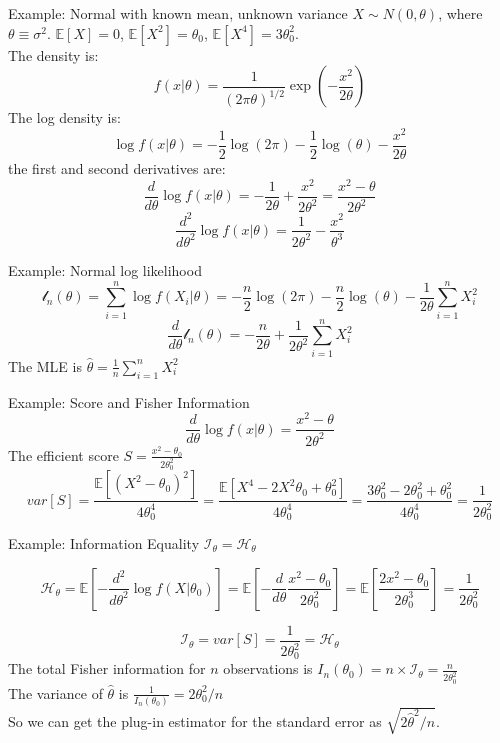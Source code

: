 \documentclass[aspectratio=169, handout, t]{beamer}
\numberwithin{equation}{section}
\begin{document}
\begin{frame}{Example: Normal with known mean, unknown variance}
$X\sim N(0, \theta)$, where $\theta\equiv \sigma^2$. $\mathbb{E}[X]=0$, $\mathbb{E}[X^2]=\theta_0$, $\mathbb{E}[X^4]=3\theta_0^2$.\\
The density is:
 $$f(x|\theta)=\frac{1}{(2\pi\theta)^{1/2}}\exp(-\frac{x^2}{2\theta})$$
The log density is:
$$\log f(x|\theta)=-\frac{1}{2}\log(2\pi)-\frac{1}{2}\log(\theta)-\frac{x^2}{2\theta}$$
the first and second derivatives are:
$$\frac{d}{d\theta}\log f(x|\theta)=-\frac{1}{2\theta}+\frac{x^2}{2\theta^2}=\frac{x^2-\theta}{2\theta^2}$$
$$\frac{d^2}{d\theta^2}\log f(x|\theta)=\frac{1}{2\theta^2}-\frac{x^2}{\theta^3}$$

\end{frame}


\begin{frame}{Example: Normal log likelihood}
$$\mathcal{l}_n(\theta)=\sum_{i=1}^n \log f(X_i|\theta)=-\frac{n}{2}\log(2\pi)-\frac{n}{2}\log(\theta)-\frac{1}{2\theta}\sum_{i=1}^n X_i^2$$
$$\frac{d}{d\theta}\mathcal{l}_n(\theta)=-\frac{n}{2\theta}+\frac{1}{2\theta^2}\sum_{i=1}^n X_i^2$$
The MLE is $\hat{\theta}=\frac{1}{n}\sum_{i=1}^n X_i^2$
\end{frame}


\begin{frame}{Example: Score and Fisher Information}
$$\frac{d}{d\theta}\log f(x|\theta)=\frac{x^2-\theta}{2\theta^2}$$
The efficient score $S=\frac{x^2-\theta_0}{2\theta_0^2}$
$$var[S]=\frac{\mathbb{E}[(X^2-\theta_0)^2]}{4\theta_0^4}=\frac{\mathbb{E}[X^4-2X^2\theta_0+\theta_0^2]}{4\theta_0^4}=\frac{3\theta_0^2-2\theta_0^2+\theta^2_0}{4\theta_0^4}=\frac{1}{2\theta_0^2}$$
\end{frame}





\begin{frame}{Example: Information Equality $\mathcal{I}_\theta=\mathcal{H}_\theta$}

$$\mathcal{H}_\theta=\mathbb{E}[-\frac{d^2}{d\theta^2} \log f(X|\theta_0)]=\mathbb{E}[-\frac{d}{d\theta}\frac{x^2-\theta_0}{2\theta_0^2}]=\mathbb{E}[\frac{2x^2-\theta_0}{2\theta_0^3}]=\frac{1}{2\theta_0^2}$$

$$\mathcal{I}_\theta=var[S]=\frac{1}{2\theta_0^2}=\mathcal{H}_\theta$$
The total Fisher information for $n$ observations is $I_n(\theta_0)=n\times \mathcal{I}_\theta=\frac{n}{2\theta^2_0}$\\
The variance of $\hat{\theta}$ is $\frac{1}{I_n(\theta_0)}=2\theta^2_0/n$\\
So we can get the plug-in estimator for the standard error as $\sqrt{2\hat{\theta}^2/n}$.
\end{frame}
\end{document}
